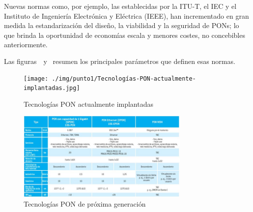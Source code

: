 Nuevas normas como, por ejemplo, las establecidas por la ITU-T, el IEC y el Instituto de Ingeniería Electrónica y Eléctrica (IEEE), han incrementado en gran medida la estandarización del diseño, la viabilidad y la seguridad de PONs; lo que brinda la oportunidad de economías escala y menores costes, no concebibles anteriormente.

Las figuras~~y~ resumen los principales parámetros que definen esas normas.

\begin{figure}[H]
	\centering
	\texttt{[image: ./img/punto1/Tecnologías-PON-actualmente-implantadas.jpg]}
	\caption{Tecnologías PON actualmente implantadas}
	\label{fig:PON_Now}
\end{figure}


\begin{figure}[H]
	\centering
	\includegraphics[width=0.75\textwidth]{./img/punto1/Tecnologías-PON-de-próxima-generación.jpg}
	\caption{Tecnologías PON de próxima generación}
	\label{fig:PON_Next}
\end{figure}